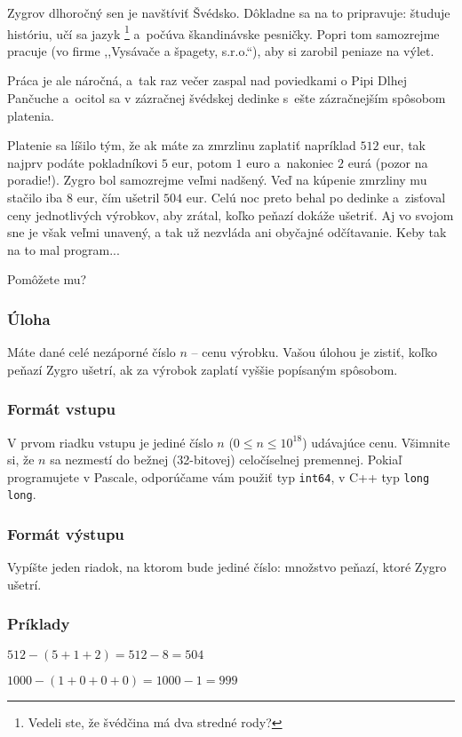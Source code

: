 Zygrov dlhoročný sen je navštíviť Švédsko. Dôkladne sa na to pripravuje: študuje históriu, učí sa jazyk%
\footnote{Vedeli ste, že švédčina má dva stredné rody?} a~počúva škandinávske pesničky.
Popri tom samozrejme pracuje (vo firme ,,Vysávače a špagety, s.r.o.``), aby si zarobil peniaze na výlet. 

Práca je ale náročná, a~tak raz večer zaspal nad poviedkami o Pipi Dlhej Pančuche
a~ocitol sa v zázračnej švédskej dedinke s~ešte zázračnejším spôsobom platenia.

Platenie sa líšilo tým, že ak máte za zmrzlinu zaplatiť napríklad $512$ eur, tak najprv podáte pokladníkovi $5$ eur,
potom $1$ euro a~nakoniec $2$ eurá (pozor na poradie!).
Zygro bol samozrejme veľmi nadšený. Veď na kúpenie zmrzliny mu stačilo iba $8$ eur, čím ušetril
$504$ eur. Celú noc preto behal po dedinke a~zisťoval ceny jednotlivých výrobkov, aby zrátal, koľko
peňazí dokáže ušetriť. Aj vo svojom sne je však veľmi unavený, a tak už nezvláda ani obyčajné
odčítavanie. Keby tak na to mal program...

Pomôžete mu?

\subsubsection{Úloha}

Máte dané celé nezáporné číslo $n$ -- cenu výrobku. Vašou úlohou je zistiť, koľko
peňazí Zygro ušetrí, ak za výrobok zaplatí vyššie popísaným spôsobom.

\subsubsection{Formát vstupu}

V prvom riadku vstupu je jediné číslo $n$ ($0 \leq n \leq 10^{18}$) udávajúce cenu. 
Všimnite si, že $n$ sa nezmestí do bežnej (32-bitovej) celočíselnej premennej.
Pokiaľ programujete v Pascale, odporúčame vám použiť typ \texttt{int64}, v C++ typ \texttt{long long}.

\subsubsection{Formát výstupu}

Vypíšte jeden riadok, na ktorom bude jediné číslo: množstvo peňazí, ktoré Zygro
ušetrí.

\subsubsection{Príklady}

$512 - (5 + 1 + 2) = 512 - 8 = 504$

$1000 - (1 + 0 + 0 + 0) = 1000 - 1 = 999$